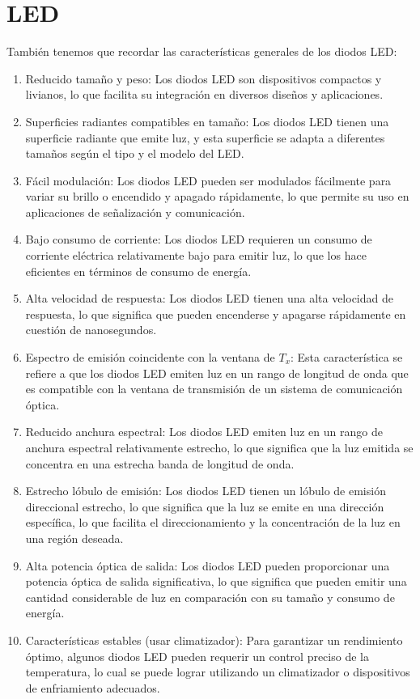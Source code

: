 \documentclass[12pt,fleqn,a4paper,oneside]{LegrandOrangeBook}
\begin{document}
\section{LED}
También tenemos que recordar las características generales de los diodos LED:
\begin{enumerate}
\item Reducido tamaño y peso: Los diodos LED son dispositivos compactos y livianos, lo que facilita su integración en diversos diseños y aplicaciones.
\item Superficies radiantes compatibles en tamaño: Los diodos LED tienen una superficie radiante que emite luz, y esta superficie se adapta a diferentes tamaños según el tipo y el modelo del LED.
\item Fácil modulación: Los diodos LED pueden ser modulados fácilmente para variar su brillo o encendido y apagado rápidamente, lo que permite su uso en aplicaciones de señalización y comunicación.
\item Bajo consumo de corriente: Los diodos LED requieren un consumo de corriente eléctrica relativamente bajo para emitir luz, lo que los hace eficientes en términos de consumo de energía.
\item Alta velocidad de respuesta: Los diodos LED tienen una alta velocidad de respuesta, lo que significa que pueden encenderse y apagarse rápidamente en cuestión de nanosegundos.
\item Espectro de emisión coincidente con la ventana de $T_x$: Esta característica se refiere a que los diodos LED emiten luz en un rango de longitud de onda que es compatible con la ventana de transmisión de un sistema de comunicación óptica.
\item Reducido anchura espectral: Los diodos LED emiten luz en un rango de anchura espectral relativamente estrecho, lo que significa que la luz emitida se concentra en una estrecha banda de longitud de onda.
\item Estrecho lóbulo de emisión: Los diodos LED tienen un lóbulo de emisión direccional estrecho, lo que significa que la luz se emite en una dirección específica, lo que facilita el direccionamiento y la concentración de la luz en una región deseada.
\item Alta potencia óptica de salida: Los diodos LED pueden proporcionar una potencia óptica de salida significativa, lo que significa que pueden emitir una cantidad considerable de luz en comparación con su tamaño y consumo de energía.
\item Características estables (usar climatizador): Para garantizar un rendimiento óptimo, algunos diodos LED pueden requerir un control preciso de la temperatura, lo cual se puede lograr utilizando un climatizador o dispositivos de enfriamiento adecuados.
\end{enumerate}
\end{document}
